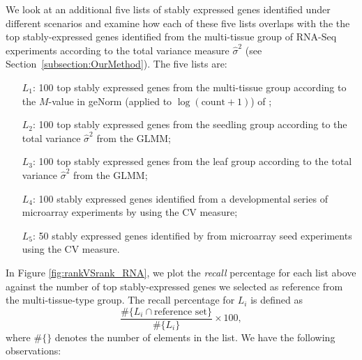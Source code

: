 \documentclass[11pt, a4paper]{article}
\begin{document}
We look at an additional five lists of stably expressed genes identified under
different scenarios and examine how each of these five lists overlaps with the
the top stably-expressed genes identified from the multi-tissue group  of
RNA-Seq experiments  according to the total variance measure $\hat\sigma^2$
(see Section~\ref{subsection:OurMethod}). 
The five lists are: 
\begin{enumerate}
    \item[$L_1$:]
 100 top stably expressed genes from the multi-tissue group according
 to the $M$-value in geNorm (applied to $\log(\text{count}+1)$) of \cite{vandesompele2002accurate} ; 
\item[$L_2$:]	
100 top stably expressed genes from the seedling group according to the total variance $\hat\sigma^2$ from the GLMM;
\item[$L_3$:]
100 top stably expressed genes from the leaf group according to the total variance $\hat\sigma^2$ from the GLMM; 
\item[$L_4$:]
100 stably expressed genes identified from a developmental series of microarray
experiments by \cite{czechowski2005genome} using the CV measure; 
\item[$L_5$:] 50 stably expressed genes identified by \cite{dekkers2012identification} from microarray
seed experiments using the CV measure.  
\end{enumerate}
In Figure \ref{fig:rankVSrank_RNA}, we plot the {\em recall} percentage for
each list above against the number of top stably-expressed genes we selected
as reference from the multi-tissue-type group. 
The recall percentage for $L_i$ is defined as 
\[ \frac{ \#	 \{L_i \cap \text{reference set} \}}{\# \{L_i\}}\times 100, \]
where $\#\{ \}$ denotes the number of elements in the list.
We have the following observations:
\end{document}
